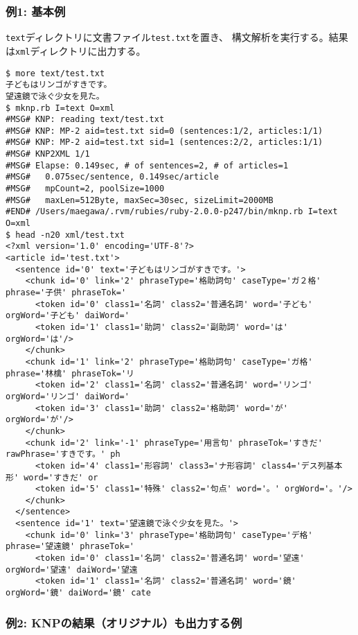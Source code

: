 \subsubsection*{例1: 基本例}

\verb|text|ディレクトリに文書ファイル\verb|test.txt|を置き、
構文解析を実行する。結果は\verb|xml|ディレクトリに出力する。


\begin{Verbatim}[baselinestretch=0.7,frame=single]
$ more text/test.txt
子どもはリンゴがすきです。
望遠鏡で泳ぐ少女を見た。
$ mknp.rb I=text O=xml
#MSG# KNP: reading text/test.txt
#MSG# KNP: MP-2 aid=test.txt sid=0 (sentences:1/2, articles:1/1)
#MSG# KNP: MP-2 aid=test.txt sid=1 (sentences:2/2, articles:1/1)
#MSG# KNP2XML 1/1
#MSG# Elapse: 0.149sec, # of sentences=2, # of articles=1
#MSG#   0.075sec/sentence, 0.149sec/article
#MSG#   mpCount=2, poolSize=1000
#MSG#   maxLen=512Byte, maxSec=30sec, sizeLimit=2000MB
#END# /Users/maegawa/.rvm/rubies/ruby-2.0.0-p247/bin/mknp.rb I=text O=xml
$ head -n20 xml/test.txt
<?xml version='1.0' encoding='UTF-8'?>
<article id='test.txt'>
  <sentence id='0' text='子どもはリンゴがすきです。'>
    <chunk id='0' link='2' phraseType='格助詞句' caseType='ガ２格' phrase='子供' phraseTok='
      <token id='0' class1='名詞' class2='普通名詞' word='子ども' orgWord='子ども' daiWord='
      <token id='1' class1='助詞' class2='副助詞' word='は' orgWord='は'/>
    </chunk>
    <chunk id='1' link='2' phraseType='格助詞句' caseType='ガ格' phrase='林檎' phraseTok='リ
      <token id='2' class1='名詞' class2='普通名詞' word='リンゴ' orgWord='リンゴ' daiWord='
      <token id='3' class1='助詞' class2='格助詞' word='が' orgWord='が'/>
    </chunk>
    <chunk id='2' link='-1' phraseType='用言句' phraseTok='すきだ' rawPhrase='すきです。' ph
      <token id='4' class1='形容詞' class3='ナ形容詞' class4='デス列基本形' word='すきだ' or
      <token id='5' class1='特殊' class2='句点' word='。' orgWord='。'/>
    </chunk>
  </sentence>
  <sentence id='1' text='望遠鏡で泳ぐ少女を見た。'>
    <chunk id='0' link='3' phraseType='格助詞句' caseType='デ格' phrase='望遠鏡' phraseTok='
      <token id='0' class1='名詞' class2='普通名詞' word='望遠' orgWord='望遠' daiWord='望遠
      <token id='1' class1='名詞' class2='普通名詞' word='鏡' orgWord='鏡' daiWord='鏡' cate
\end{Verbatim}
\subsubsection*{例2: KNPの結果（オリジナル）も出力する例}


